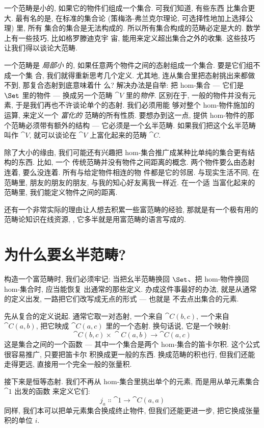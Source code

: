 
\lettrine[lhang=0.17]{一}{个范畴是小的}, 如果它的物件们组成一个集合. 可我们知道, 有些东西
比集合更大. 最有名的是, 在标准的集合论 (策梅洛-弗兰克尔理论, 可选择性地加上选择公理) 里, 所有
集合的集合是无法构成的. 所以所有集合构成的范畴必定是大的. 数学上有一些技巧, 比如格罗滕迪克宇
宙, 能用来定义超出集合之外的收集. 这些技巧让我们得以谈论大范畴.

一个范畴是 \emph{局部小} 的, 如果任意两个物件之间的态射组成一个集合. 要是它们组不成一个集
合, 我们就得重新思考几个定义. 尤其地, 连从集合里把态射挑出来都做不到, 那复合态射到底意味着什
么? 解决办法是自举: 把 hom-集合 --- 它们是 $\Set$ 里的物件 --- 换成另一个范畴 $\cat{V}$
里的\emph{物件}. 区别在于, 一般的物件并没有元素, 于是我们再也不许谈论单个的态射. 我们必须用能
够对整个 hom-物件施加的运算, 来定义一个 \emph{富化的} 范畴的所有性质. 要想办到这一点, 提供
hom-物件的那个范畴必须带有额外的结构 --- 它必须是一个幺半范畴. 如果我们把这个幺半范畴叫作
$\cat{V}$, 就可以谈论在 $\cat{V}$ 上富化起来的范畴 $\cat{C}$.

除了大小的缘由, 我们可能还有兴趣把 hom-集合推广成某种比单纯的集合更有结构的东西. 比如, 一个
传统范畴并没有物件之间距离的概念. 两个物件要么由态射连着, 要么没连着. 所有与给定物件相连的物
件都是它的邻居. 与现实生活不同, 在范畴里, 朋友的朋友的朋友, 与我的知心好友离我一样近. 在一个适
当富化起来的范畴里, 我们能定义物件之间的距离.

还有一个非常实际的理由让人想去积累一些富范畴的经验, 那就是有一个极有用的范畴论知识在线资源,
, 它多半就是用富范畴的语言写成的.

\section{为什么要幺半范畴?}

构造一个富范畴时, 我们必须牢记: 当把幺半范畴换回 $\Set$、把 hom-物件换回 hom-集合时, 应当能恢复
出通常的那些定义. 办成这件事最好的办法, 就是从通常的定义出发, 一路把它们改写成无点的形式 --- 也就是
不去点出集合的元素.

先从复合的定义说起. 通常它取一对态射, 一个来自 $\cat{C}(b, c)$, 一个来自 $\cat{C}(a, b)$,
把它映成 $\cat{C}(a, c)$ 里的一个态射. 换句话说, 它是一个映射:
\[\cat{C}(b, c)\times{}\cat{C}(a, b) \to \cat{C}(a, c)\]
这是集合之间的一个函数 --- 其中一个集合是两个 hom-集合的笛卡尔积. 这个公式很容易推广, 只要把笛卡尔
积换成更一般的东西. 换成范畴的积也行, 但我们还能走得更远, 直接用一个完全一般的张量积.

接下来是恒等态射. 我们不再从 hom-集合里挑出单个的元素, 而是用从单元素集合 $\cat{1}$ 出发的函数
来定义它们:
\[j_a \Colon \cat{1} \to \cat{C}(a, a)\]
同样, 我们本可以把单元素集合换成终止物件, 但我们还能更进一步, 把它换成张量积的单位 $i$.

